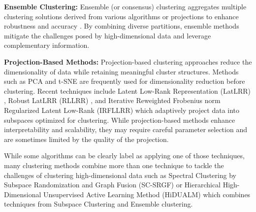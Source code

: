 \textbf{Ensemble Clustering:} Ensemble (or consensus) clustering aggregates multiple clustering solutions derived from various algorithms or projections to enhance robustness and accuracy \cite{clusterensembles2003}. By combining diverse partitions, ensemble methods mitigate the challenges posed by high-dimensional data and leverage complementary information.

\textbf{Projection-Based Methods:} Projection-based clustering approaches reduce the dimensionality of data while retaining meaningful cluster structures. Methods such as PCA \cite{pca1901} and t-SNE \cite{tsne2008} are frequently used for dimensionality reduction before clustering. Recent techniques include Latent Low-Rank Representation (LatLRR) \cite{llr2013}, Robust LatLRR (RLLRR) \cite{RLLRR2014}, and Iterative Reweighted Frobenius norm Regularized Latent Low-Rank (IRFLLRR) \cite{irfllrr2023} which adaptively project data into subspaces optimized for clustering. While projection-based methods enhance interpretability and scalability, they may require careful parameter selection and are sometimes limited by the quality of the projection.

While some algorithms can be clearly label as applying one of those techniques, many clustering methods combine more than one technique to tackle the challenges of clustering high-dimensional data such as Spectral Clustering by Subspace Randomization and Graph Fusion (SC-SRGF) \cite{sc-srgf2020} or Hierarchical High-Dimensional Unsupervised Active Learning Method (HiDUALM) \cite{hidualm2024} which combines techniques from Subspace Clustering and Ensemble clustering. 




